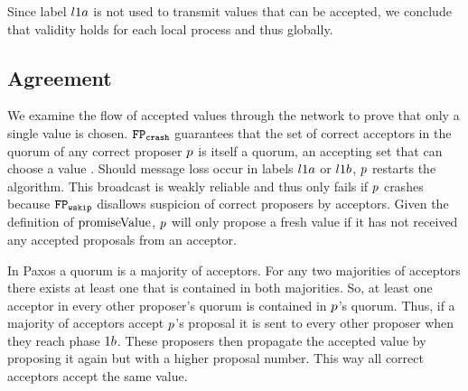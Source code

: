 Since label $l1a$ is not used to transmit values that can be accepted, we conclude that validity holds for each local process and thus globally.

\subsection{Agreement}
We examine the flow of accepted values through the network to prove that only a single value is chosen.
$\mathtt{FP_{crash}}$ guarantees that the set of correct acceptors in the quorum of any correct proposer $p$ is itself a quorum, \ie an accepting set that can choose a value \cite{Lamport06}.
Should message loss occur in labels $l1a$ or $l1b$, $p$ restarts the algorithm.
This broadcast is weakly reliable and thus only fails if $p$ crashes because $\mathtt{FP_{wskip}}$ disallows suspicion of correct proposers by acceptors.
Given the definition of $\operatorname{promiseValue}$, $p$ will only propose a fresh value if it has not received any accepted proposals from an acceptor.

In Paxos a quorum is a majority of acceptors.
For any two majorities of acceptors there exists at least one that is contained in both majorities.
So, at least one acceptor in every other proposer's quorum is contained in $p$'s quorum.
Thus, if a majority of acceptors accept $p$'s proposal it is sent to every other proposer when they reach phase $1b$.
These proposers then propagate the accepted value by proposing it again but with a higher proposal number.
This way all correct acceptors accept the same value.

